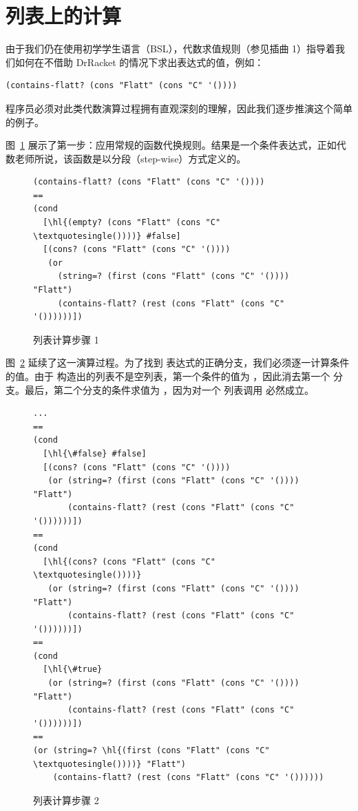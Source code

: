 \section{列表上的计算}
\label{sec:ch08_computing_with_lists}

由于我们仍在使用初学学生语言（BSL），代数求值规则（参见插曲 1）指导着我们如何在不借助 DrRacket 的情况下求出表达式的值，例如：
\begin{lstlisting}[language=BSL]
(contains-flatt? (cons "Flatt" (cons "C" '())))
\end{lstlisting}
程序员必须对此类代数演算过程拥有直观深刻的理解，因此我们逐步推演这个简单的例子。

图~\ref{fig:computing_with_lists_step1} 展示了第一步：应用常规的函数代换规则。结果是一个条件表达式，正如代数老师所说，该函数是以分段（step-wise）方式定义的。

\begin{figure}[htbp]
  \centering
  \begin{stepperbox}[unbreakable]
\begin{Verbatim}[commandchars=\\\{\}, fontsize=\scriptsize]
(contains-flatt? (cons "Flatt" (cons "C" '())))
==
(cond
  [\hl{(empty? (cons "Flatt" (cons "C" \textquotesingle())))} #false]
  [(cons? (cons "Flatt" (cons "C" '())))
   (or
     (string=? (first (cons "Flatt" (cons "C" '()))) "Flatt")
     (contains-flatt? (rest (cons "Flatt" (cons "C" '())))))])
\end{Verbatim}
  \end{stepperbox}
  \caption{列表计算步骤 1}
  \label{fig:computing_with_lists_step1}
\end{figure}

图~\ref{fig:computing_with_lists_step2} 延续了这一演算过程。为了找到  表达式的正确分支，我们必须逐一计算条件的值。由于  构造出的列表不是空列表，第一个条件的值为 ，因此消去第一个  分支。最后，第二个分支的条件求值为 ，因为对一个  列表调用  必然成立。

\begin{figure}[htbp]
  \centering
  \begin{stepperbox}[unbreakable]
\begin{Verbatim}[commandchars=\\\{\}, fontsize=\scriptsize]
...
==
(cond
  [\hl{\#false} #false]
  [(cons? (cons "Flatt" (cons "C" '())))
   (or (string=? (first (cons "Flatt" (cons "C" '()))) "Flatt")
       (contains-flatt? (rest (cons "Flatt" (cons "C" '())))))])
==
(cond
  [\hl{(cons? (cons "Flatt" (cons "C" \textquotesingle())))}
   (or (string=? (first (cons "Flatt" (cons "C" '()))) "Flatt")
       (contains-flatt? (rest (cons "Flatt" (cons "C" '())))))])
==
(cond
  [\hl{\#true}
   (or (string=? (first (cons "Flatt" (cons "C" '()))) "Flatt")
       (contains-flatt? (rest (cons "Flatt" (cons "C" '())))))])
==
(or (string=? \hl{(first (cons "Flatt" (cons "C" \textquotesingle())))} "Flatt")
    (contains-flatt? (rest (cons "Flatt" (cons "C" '())))))
\end{Verbatim}
  \end{stepperbox}
  \caption{列表计算步骤 2}
  \label{fig:computing_with_lists_step2}
\end{figure}

